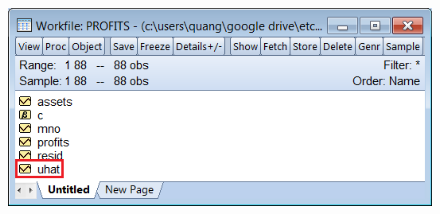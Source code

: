 \documentclass[12pt]{report}
\begin{document}
\vspace{-\baselineskip}
\begin{figure}[H]
	\centering
	\includegraphics{q1_11}
\end{figure}
\vspace{-\baselineskip}
\end{document}
